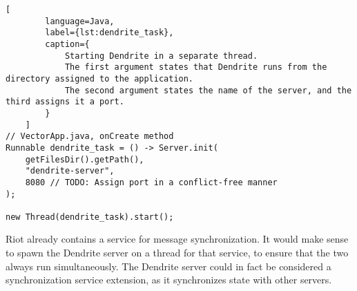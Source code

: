 \begin{lstfloat}
    \begin{lstlisting}[
        language=Java,
        label={lst:dendrite_task},
        caption={
            Starting Dendrite in a separate thread.
            The first argument states that Dendrite runs from the directory assigned to the application.
            The second argument states the name of the server, and the third assigns it a port.
        }
    ]
// VectorApp.java, onCreate method
Runnable dendrite_task = () -> Server.init(
    getFilesDir().getPath(),
    "dendrite-server",
    8080 // TODO: Assign port in a conflict-free manner
);

new Thread(dendrite_task).start();
\end{lstlisting}
\end{lstfloat}

Riot already contains a service for message synchronization.
It would make sense to spawn the Dendrite server on a thread for that service, to ensure that the two always run simultaneously.
The Dendrite server could in fact be considered a synchronization service extension, as it synchronizes state with other servers.






